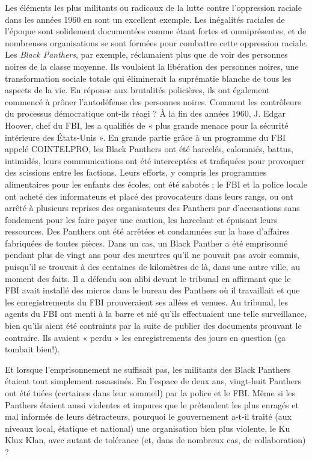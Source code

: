 Les éléments les plus militants ou radicaux de la lutte contre l'oppression raciale dans les années 1960 en sont un excellent exemple. Les inégalités raciales de l'époque sont solidement documentées comme étant fortes et omniprésentes, et de nombreuses organisations se sont formées pour combattre cette oppression raciale. Les \emph{Black Panthers}, par exemple, réclamaient plus que de voir des personnes noires de la classe moyenne. Ils voulaient la libération des personnes noires, une transformation sociale totale qui éliminerait la suprématie blanche de tous les aspects de la vie. En réponse aux brutalités policières, ils ont également commencé à prôner l'autodéfense des personnes noires. Comment les contrôleurs du processus démocratique ont-ils réagi ? À la fin des années 1960, J. Edgar Hoover, chef du FBI, les a qualifiés de « plus grande menace pour la sécurité intérieure des États-Unis ». En grande partie grâce à un programme du FBI appelé COINTELPRO, les Black Panthers ont été harcelés, calomniés, battus, intimidés, leurs communications ont été interceptées et trafiquées pour provoquer des scissions entre les factions. Leurs efforts, y compris les programmes alimentaires pour les enfants des écoles, ont été sabotés ; le FBI et la police locale ont acheté des informateurs et placé des provocateurs dans leurs rangs, ou ont arrêté à plusieurs reprises des organisateurs des Panthers par d'accusations sans fondement pour les faire payer une caution, les harcelant et épuisant leurs ressources. Des Panthers ont été arrêtées et condamnées sur la base d'affaires fabriquées de toutes pièces. Dans un cas, un Black Panther a été emprisonné pendant plus de vingt ans pour des meurtres qu'il ne pouvait pas avoir commis, puisqu'il se trouvait à des centaines de kilomètres de là, dans une autre ville, au moment des faits. Il a défendu son alibi devant le tribunal en affirmant que le FBI avait installé des micros dans le bureau des Panthers où il travaillait et que les enregistrements du FBI prouveraient ses allées et venues. Au tribunal, les agents du FBI ont menti à la barre et nié qu'ils effectuaient une telle surveillance, bien qu'ils aient été contraints par la suite de publier des documents prouvant le contraire. Ils avaient « perdu » les enregistrements des jours en question (ça tombait bien!).

Et lorsque l'emprisonnement ne suffisait pas, les militants des Black Panthers étaient tout simplement assassinés. En l'espace de deux ans, vingt-huit Panthers ont été tuées (certaines dans leur sommeil) par la police et le FBI. Même si les Panthers étaient aussi violentes et impures que le prétendent les plus enragés et mal informés de leurs détracteurs, pourquoi le gouvernement a-t-il traité (aux niveaux local, étatique et national) une organisation bien plus violente, le Ku Klux Klan, avec autant de tolérance (et, dans de nombreux cas, de collaboration) ?

